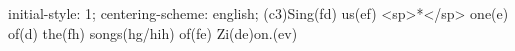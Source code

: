initial-style: 1;
centering-scheme: english;
(c3)Sing(fd) us(ef) <sp>*</sp> one(e) of(d) the(fh) songs(hg/hih) of(fe) Zi(de)on.(ev)